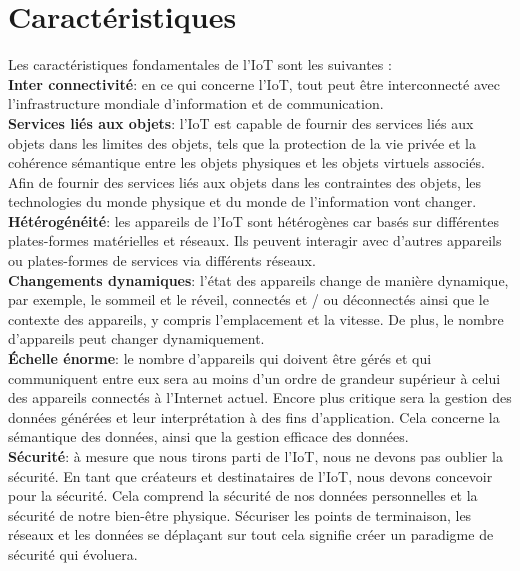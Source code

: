 	
	\section{Caractéristiques}
	Les caractéristiques fondamentales de l'IoT sont les suivantes \cite{patel2016iot,vermesan2014iot}:\\
	
	\textbf{Inter connectivité}: en ce qui concerne l'IoT, tout peut être interconnecté avec l'infrastructure mondiale d'information et de communication.\\
	
	\textbf{Services liés aux objets}: l'IoT est capable de fournir des services liés aux objets dans les limites des objets, tels que la protection de la vie privée et la cohérence sémantique entre les objets physiques et les objets virtuels associés. Af{\kern0pt}in de fournir des services liés aux objets dans les contraintes des objets, les technologies du monde physique et du monde de l'information vont changer.\\
	
	\textbf{Hétérogénéité}: les appareils de l'IoT sont hétérogènes car basés sur dif{\kern0pt}férentes  plates-formes matérielles et réseaux. Ils peuvent interagir avec d'autres appareils ou plates-formes de services via dif{\kern0pt}férents réseaux.\\

	\textbf{Changements dynamiques}: l'état des appareils change de manière dynamique, par exemple, le sommeil et le réveil, connectés et / ou déconnectés ainsi que le contexte des appareils, y compris l'emplacement et la vitesse. De plus, le nombre d'appareils peut changer dynamiquement.\\
	
	\textbf{Échelle énorme}: le nombre d'appareils qui doivent être gérés et qui communiquent entre eux sera au moins d'un ordre de grandeur supérieur à celui des appareils connectés à l'Internet actuel. Encore plus critique sera la gestion des données générées et leur interprétation à des f{\kern0pt}ins d'application. Cela concerne la sémantique des données, ainsi que la gestion ef{\kern0pt}f{\kern0pt}icace des données.\\
	
	\textbf{Sécurité}: à mesure que nous tirons parti de l'IoT, nous ne devons pas oublier la sécurité. En tant que créateurs et destinataires de l'IoT, nous devons concevoir pour la sécurité. Cela comprend la sécurité de nos données personnelles et la sécurité de notre bien-être physique. Sécuriser les points de terminaison, les réseaux et les données se déplaçant sur tout cela signif{\kern0pt}ie créer un paradigme de sécurité qui évoluera.\\
	
